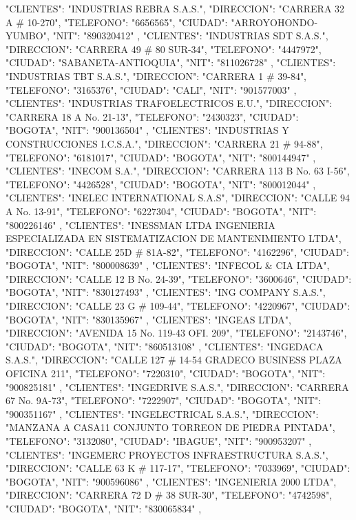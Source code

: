    {
   "CLIENTES": "INDUSTRIAS REBRA S.A.S.",
   "DIRECCION": "CARRERA 32 A # 10-270",
   "TELEFONO": "6656565",
   "CIUDAD": "ARROYOHONDO-YUMBO",
   "NIT": "890320412"
   },
   {
   "CLIENTES": "INDUSTRIAS SDT S.A.S.",
   "DIRECCION": "CARRERA 49 # 80 SUR-34",
   "TELEFONO": "4447972",
   "CIUDAD": "SABANETA-ANTIOQUIA",
   "NIT": "811026728"
   },
   {
   "CLIENTES": "INDUSTRIAS TBT S.A.S.",
   "DIRECCION": "CARRERA 1 # 39-84",
   "TELEFONO": "3165376",
   "CIUDAD": "CALI",
   "NIT": "901577003"
   },
   {
   "CLIENTES": "INDUSTRIAS TRAFOELECTRICOS E.U.",
   "DIRECCION": "CARRERA 18 A No. 21-13",
   "TELEFONO": "2430323",
   "CIUDAD": "BOGOTA",
   "NIT": "900136504"
   },
   {
   "CLIENTES": "INDUSTRIAS Y CONSTRUCCIONES I.C.S.A.",
   "DIRECCION": "CARRERA 21 # 94-88",
   "TELEFONO": "6181017",
   "CIUDAD": "BOGOTA",
   "NIT": "800144947"
   },
   {
   "CLIENTES": "INECOM S.A.",
   "DIRECCION": "CARRERA 113 B No. 63 I-56",
   "TELEFONO": "4426528",
   "CIUDAD": "BOGOTA",
   "NIT": "800012044"
   },
   {
   "CLIENTES": "INELEC INTERNATIONAL S.A.S",
   "DIRECCION": "CALLE 94 A No. 13-91",
   "TELEFONO": "6227304",
   "CIUDAD": "BOGOTA",
   "NIT": "800226146"
   },
   {
   "CLIENTES": "INESSMAN LTDA INGENIERIA ESPECIALIZADA EN SISTEMATIZACION DE MANTENIMIENTO LTDA",
   "DIRECCION": "CALLE 25D # 81A-82",
   "TELEFONO": "4162296",
   "CIUDAD": "BOGOTA",
   "NIT": "800008639"
   },
   {
   "CLIENTES": "INFECOL & CIA LTDA",
   "DIRECCION": "CALLE 12 B No. 24-39",
   "TELEFONO": "3600646",
   "CIUDAD": "BOGOTA",
   "NIT": "830127493"
   },
   {
   "CLIENTES": "ING COMPANY S.A.S.",
   "DIRECCION": "CALLE 23 G # 109-44",
   "TELEFONO": "4220967",
   "CIUDAD": "BOGOTA",
   "NIT": "830135967"
   },
   {
   "CLIENTES": "INGEAS LTDA",
   "DIRECCION": "AVENIDA 15 No. 119-43 OFI. 209",
   "TELEFONO": "2143746",
   "CIUDAD": "BOGOTA",
   "NIT": "860513108"
   },
   {
   "CLIENTES": "INGEDACA S.A.S.",
   "DIRECCION": "CALLE 127 # 14-54 GRADECO BUSINESS PLAZA OFICINA 211",
   "TELEFONO": "7220310",
   "CIUDAD": "BOGOTA",
   "NIT": "900825181"
   },
   {
   "CLIENTES": "INGEDRIVE S.A.S.",
   "DIRECCION": "CARRERA 67 No. 9A-73",
   "TELEFONO": "7222907",
   "CIUDAD": "BOGOTA",
   "NIT": "900351167"
   },
   {
   "CLIENTES": "INGELECTRICAL S.A.S.",
   "DIRECCION": "MANZANA A CASA11 CONJUNTO TORREON DE PIEDRA PINTADA",
   "TELEFONO": "3132080",
   "CIUDAD": "IBAGUE",
   "NIT": "900953207"
   },
   {
   "CLIENTES": "INGEMERC PROYECTOS INFRAESTRUCTURA S.A.S.",
   "DIRECCION": "CALLE 63 K # 117-17",
   "TELEFONO": "7033969",
   "CIUDAD": "BOGOTA",
   "NIT": "900596086"
   },
   {
   "CLIENTES": "INGENIERIA 2000 LTDA",
   "DIRECCION": "CARRERA 72 D # 38 SUR-30",
   "TELEFONO": "4742598",
   "CIUDAD": "BOGOTA",
   "NIT": "830065834"
   },
